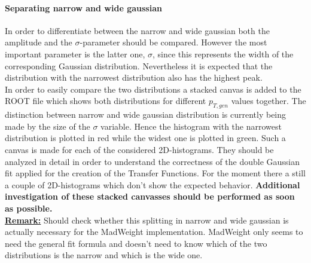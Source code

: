 \paragraph{Separating narrow and wide gaussian\\}
In order to differentiate between the narrow and wide gaussian both the amplitude and the $\sigma$-parameter should be compared. However the most important parameter is the latter one, $\sigma$, since this represents the width of the corresponding Gaussian distribution. Nevertheless it is expected that the distribution with the narrowest distribution also has the highest peak.\\
In order to easily compare the two distributions a stacked canvas is added to the ROOT file which shows both distributions for different $p_{T,gen}$ values together. The distinction between narrow and wide gaussian distribution is currently being made by the size of the $\sigma$ variable. Hence the histogram with the narrowest distribution is plotted in red while the widest one is plotted in green.
Such a canvas is made for each of the considered 2D-histograms. They should be analyzed in detail in order to understand the correctness of the double Gaussian fit applied for the creation of the Transfer Functions. For the moment there a still a couple of 2D-histograms which don't show the expected behavior. \textbf{Additional investigation of these stacked canvasses should be performed as soon as possible.}\\

\textbf{\underline{Remark:}} Should check whether this splitting in narrow and wide gaussian is actually necessary for the MadWeight implementation. MadWeight only seems to need the general fit formula and doesn't need to know which of the two distributions is the narrow and which is the wide one.


